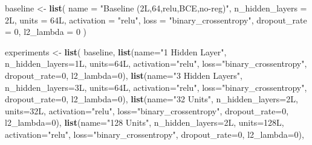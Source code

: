 \documentclass[
]{article}
\newenvironment{Shaded}{\begin{snugshade}}{\end{snugshade}}
\newcommand{\AttributeTok}[1]{\textcolor[rgb]{0.13,0.29,0.53}{#1}}
\newcommand{\DataTypeTok}[1]{\textcolor[rgb]{0.13,0.29,0.53}{#1}}
\newcommand{\DecValTok}[1]{\textcolor[rgb]{0.00,0.00,0.81}{#1}}
\newcommand{\FunctionTok}[1]{\textcolor[rgb]{0.13,0.29,0.53}{\textbf{#1}}}
\newcommand{\NormalTok}[1]{#1}
\newcommand{\OtherTok}[1]{\textcolor[rgb]{0.56,0.35,0.01}{#1}}
\newcommand{\StringTok}[1]{\textcolor[rgb]{0.31,0.60,0.02}{#1}}
\begin{document}
\begin{Shaded}
\begin{Highlighting}[]
\NormalTok{baseline }\OtherTok{\textless{}{-}} \FunctionTok{list}\NormalTok{(}
  \AttributeTok{name =} \StringTok{"Baseline (2L,64,relu,BCE,no{-}reg)"}\NormalTok{,}
  \AttributeTok{n\_hidden\_layers =} \DecValTok{2}\DataTypeTok{L}\NormalTok{, }\AttributeTok{units =} \DecValTok{64}\DataTypeTok{L}\NormalTok{, }\AttributeTok{activation =} \StringTok{"relu"}\NormalTok{, }\AttributeTok{loss =} \StringTok{"binary\_crossentropy"}\NormalTok{,}
  \AttributeTok{dropout\_rate =} \DecValTok{0}\NormalTok{, }\AttributeTok{l2\_lambda =} \DecValTok{0}
\NormalTok{)}

\NormalTok{experiments }\OtherTok{\textless{}{-}} \FunctionTok{list}\NormalTok{(}
\NormalTok{  baseline,}
  \FunctionTok{list}\NormalTok{(}\AttributeTok{name=}\StringTok{"1 Hidden Layer"}\NormalTok{,  }\AttributeTok{n\_hidden\_layers=}\DecValTok{1}\DataTypeTok{L}\NormalTok{, }\AttributeTok{units=}\DecValTok{64}\DataTypeTok{L}\NormalTok{, }\AttributeTok{activation=}\StringTok{"relu"}\NormalTok{, }\AttributeTok{loss=}\StringTok{"binary\_crossentropy"}\NormalTok{, }\AttributeTok{dropout\_rate=}\DecValTok{0}\NormalTok{,   }\AttributeTok{l2\_lambda=}\DecValTok{0}\NormalTok{),}
  \FunctionTok{list}\NormalTok{(}\AttributeTok{name=}\StringTok{"3 Hidden Layers"}\NormalTok{, }\AttributeTok{n\_hidden\_layers=}\DecValTok{3}\DataTypeTok{L}\NormalTok{, }\AttributeTok{units=}\DecValTok{64}\DataTypeTok{L}\NormalTok{, }\AttributeTok{activation=}\StringTok{"relu"}\NormalTok{, }\AttributeTok{loss=}\StringTok{"binary\_crossentropy"}\NormalTok{, }\AttributeTok{dropout\_rate=}\DecValTok{0}\NormalTok{,   }\AttributeTok{l2\_lambda=}\DecValTok{0}\NormalTok{),}
  \FunctionTok{list}\NormalTok{(}\AttributeTok{name=}\StringTok{"32 Units"}\NormalTok{,        }\AttributeTok{n\_hidden\_layers=}\DecValTok{2}\DataTypeTok{L}\NormalTok{, }\AttributeTok{units=}\DecValTok{32}\DataTypeTok{L}\NormalTok{, }\AttributeTok{activation=}\StringTok{"relu"}\NormalTok{, }\AttributeTok{loss=}\StringTok{"binary\_crossentropy"}\NormalTok{, }\AttributeTok{dropout\_rate=}\DecValTok{0}\NormalTok{,   }\AttributeTok{l2\_lambda=}\DecValTok{0}\NormalTok{),}
  \FunctionTok{list}\NormalTok{(}\AttributeTok{name=}\StringTok{"128 Units"}\NormalTok{,       }\AttributeTok{n\_hidden\_layers=}\DecValTok{2}\DataTypeTok{L}\NormalTok{, }\AttributeTok{units=}\DecValTok{128}\DataTypeTok{L}\NormalTok{, }\AttributeTok{activation=}\StringTok{"relu"}\NormalTok{, }\AttributeTok{loss=}\StringTok{"binary\_crossentropy"}\NormalTok{, }\AttributeTok{dropout\_rate=}\DecValTok{0}\NormalTok{,  }\AttributeTok{l2\_lambda=}\DecValTok{0}\NormalTok{),}

\end{Highlighting}
\end{Shaded}
\end{document}

